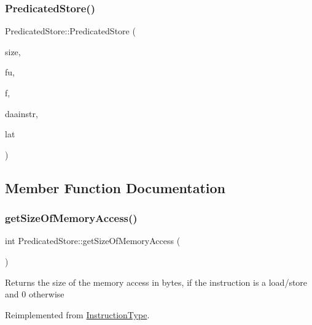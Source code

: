 \subsubsection{\texorpdfstring{Predicated\+Store()}{PredicatedStore()}}
{\footnotesize\ttfamily Predicated\+Store\+::\+Predicated\+Store (\begin{DoxyParamCaption}\item[{int}]{size,  }\item[{const string \&}]{fu,  }\item[{const set$<$ \hyperlink{classInstructionFormat}{Instruction\+Format} $\ast$$>$ \&}]{f,  }\item[{\hyperlink{classDAAInstruction}{D\+A\+A\+Instruction} $\ast$}]{daainstr,  }\item[{int}]{lat }\end{DoxyParamCaption})}



\subsection{Member Function Documentation}
\mbox{\label{classPredicatedStore_a79f5e84001443055c5ae0547ec337759}} 
\subsubsection{\texorpdfstring{get\+Size\+Of\+Memory\+Access()}{getSizeOfMemoryAccess()}}
{\footnotesize\ttfamily int Predicated\+Store\+::get\+Size\+Of\+Memory\+Access (\begin{DoxyParamCaption}{ }\end{DoxyParamCaption})\hspace{0.3cm}{\ttfamily [virtual]}}

Returns the size of the memory access in bytes, if the instruction is a load/store and 0 otherwise 

Reimplemented from \hyperlink{classInstructionType_a40c94ccf0b13f186524e06972f08bca3}{Instruction\+Type}.

\mbox{\label{classPredicatedStore_a204c4cac7241d1d1b61719c5fcbc6512}} 
